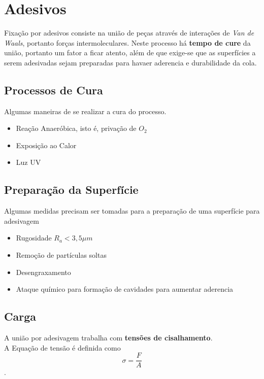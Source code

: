 \section{Adesivos}

Fixação por adesivos consiste na união de peças através de interações de \textit{Van de Waals}, portanto forças intermoleculares. Neste processo há \textbf{tempo de cure} da união, portanto um fator a ficar atento, além de que exige-se que as superfícies a serem adesivadas sejam preparadas para havaer aderencia e durabilidade da cola.

\subsection{Processos de Cura}

Algumas maneiras de se realizar a cura do processo.

\begin{itemize}
	\item Reação Anaeróbica, isto é, privação de $O_2$
	\item Exposição ao Calor 
	\item Luz UV
\end{itemize}

\subsection{Preparação da Superfície}

Algumas medidas precisam ser tomadas para a preparação de uma superfície para adesivagem

\begin{itemize}
	\item Rugosidade $R_a < 3,5 \mu m$
	\item Remoção de partículas soltas
	\item Desengraxamento
	\item Ataque químico para formação de cavidades para aumentar aderencia
\end{itemize}

\subsection{Carga}

A união por adesivagem trabalha com \textbf{tensões de cisalhamento}.\\
A Equação de tensão é definida como $$\sigma = \frac{F}{A}$$.\\

